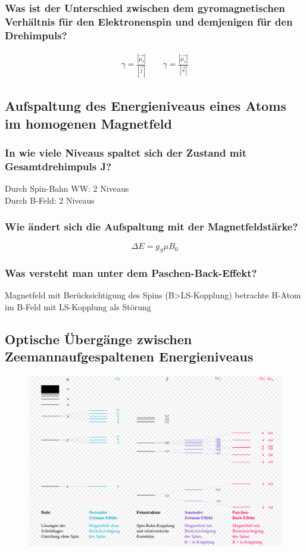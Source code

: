 \subsubsection{Was ist der Unterschied zwischen dem gyromagnetischen Verhältnis für den Elektronenspin und demjenigen für den Drehimpuls?}
\begin{align*}
    \gamma=\frac{|\vec{\mu_l}|}{|\vec{l}|} \qquad
    \gamma=\frac{|\vec{\mu_s}|}{|\vec{s}|}
\end{align*}


\subsection{Aufspaltung des Energieniveaus eines Atoms im homogenen Magnetfeld}

\subsubsection{In wie viele Niveaus spaltet sich der Zustand mit Gesamtdrehimpuls J?}
Durch Spin-Bahn WW: 2 Niveaus\\\noindent
Durch B-Feld: 2 Niveaus

\subsubsection{Wie ändert sich die Aufspaltung mit der Magnetfeldstärke?}
\begin{equation*}
    \Delta E=g_S\mu B_0
\end{equation*}

\subsubsection{Was versteht man unter dem Paschen-Back-Effekt?}
Magnetfeld mit Berücksichtigung des Spins (B>LS-Kopplung)
\to betrachte H-Atom im B-Feld mit LS-Kopplung als Störung


\subsection{Optische Übergänge zwischen Zeemannaufgespaltenen Energieniveaus}
\begin{figure}[H]
    \centering
    \includegraphics[scale=0.4]{pictures/Aufspaltung.png}
\end{figure}

